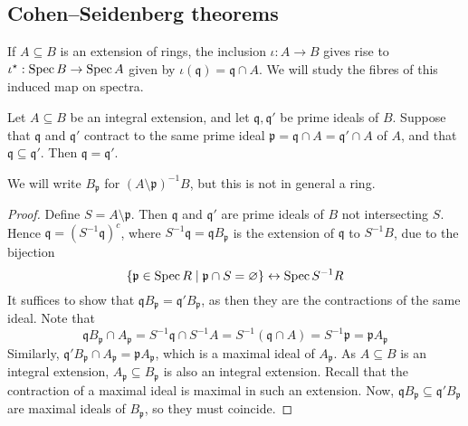 \subsection{Cohen--Seidenberg theorems}
If \( A \subseteq B \) is an extension of rings, the inclusion \( \iota : A \to B \) gives rise to \( \iota^\star : \operatorname{Spec} B \to \operatorname{Spec} A \) given by \( \iota(\mathfrak q) = \mathfrak q \cap A \).
We will study the fibres of this induced map on spectra.
\begin{proposition}[incomparability]
    Let \( A \subseteq B \) be an integral extension, and let \( \mathfrak q, \mathfrak q' \) be prime ideals of \( B \).
    Suppose that \( \mathfrak q \) and \( \mathfrak q' \) contract to the same prime ideal \( \mathfrak p = \mathfrak q \cap A = \mathfrak q' \cap A \) of \( A \), and that \( \mathfrak q \subseteq \mathfrak q' \).
    Then \( \mathfrak q = \mathfrak q' \).
\end{proposition}
We will write \( B_{\mathfrak p} \) for \( (A \setminus \mathfrak p)^{-1} B \), but this is not in general a ring.
\begin{proof}
    Define \( S = A \setminus \mathfrak p \).
    Then \( \mathfrak q \) and \( \mathfrak q' \) are prime ideals of \( B \) not intersecting \( S \).
    Hence \( \mathfrak q = (S^{-1} \mathfrak q)^c \), where \( S^{-1} \mathfrak q = \mathfrak q B_{\mathfrak p} \) is the extension of \( \mathfrak q \) to \( S^{-1} B \), due to the bijection
    \[ \qty{\mathfrak p \in \operatorname{Spec}R \mid \mathfrak p \cap S = \varnothing} \leftrightarrow \operatorname{Spec} S^{-1}R \]
    It suffices to show that \( \mathfrak q B_{\mathfrak p} = \mathfrak q' B_{\mathfrak p} \), as then they are the contractions of the same ideal.
    Note that
    \[ \mathfrak q B_{\mathfrak p} \cap A_{\mathfrak p} = S^{-1} \mathfrak q \cap S^{-1} A = S^{-1} (\mathfrak q \cap A) = S^{-1} \mathfrak p = \mathfrak p A_{\mathfrak p} \]
    Similarly, \( \mathfrak q' B_{\mathfrak p} \cap A_{\mathfrak p} = \mathfrak p A_{\mathfrak p} \), which is a maximal ideal of \( A_{\mathfrak p} \).
    As \( A \subseteq B \) is an integral extension, \( A_{\mathfrak p} \subseteq B_{\mathfrak p} \) is also an integral extension.
    Recall that the contraction of a maximal ideal is maximal in such an extension.
    Now, \( \mathfrak q B_{\mathfrak p} \subseteq \mathfrak q' B_{\mathfrak p} \) are maximal ideals of \( B_{\mathfrak p} \), so they must coincide.
\end{proof}
